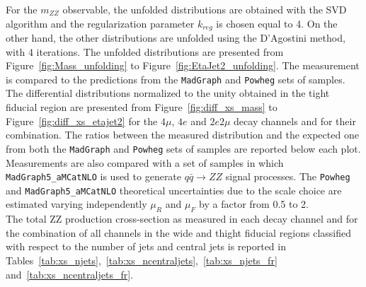 For the $m_{ZZ}$ observable, the unfolded distributions are obtained with the SVD algorithm and the regularization
parameter $k_{reg}$ is chosen equal to 4. On the other hand, the other distributions are unfolded using the D'Agostini method, with 4 iterations. The unfolded distributions are presented from Figure~\ref{fig:Mass_unfolding} to Figure~\ref{fig:EtaJet2_unfolding}. The measurement is compared to the predictions from the \texttt{MadGraph} and \texttt{Powheg} sets of samples. The differential distributions normalized to the unity obtained in the tight fiducial region are presented 
from Figure~\ref{fig:diff_xs_mass} to Figure~\ref{fig:diff_xs_etajet2} for the $4\mu$, $4e$ and $2e2\mu$ decay channels 
and for their combination. The ratios between the measured distribution and the expected one from both the \texttt{MadGraph} and \texttt{Powheg} sets of samples are reported below each plot. Measurements are also compared with a set of samples in which \texttt{MadGraph5\_aMCatNLO} is used to generate $q\bar{q}\to ZZ$ signal processes. The  \texttt{Powheg} and \texttt{MadGraph5\_aMCatNLO} theoretical uncertainties due to the scale choice are estimated varying independently $\mu_R$ and $\mu_F$ by a factor from 0.5 to 2.\\ 
The total ZZ production cross-section as measured in each decay channel and for the combination of all channels in the wide and thight fiducial regions classified with respect to the number of jets and central jets is reported in Tables~\ref{tab:xs_njets},~\ref{tab:xs_ncentraljets},~\ref{tab:xs_njets_fr} and~\ref{tab:xs_ncentraljets_fr}.

